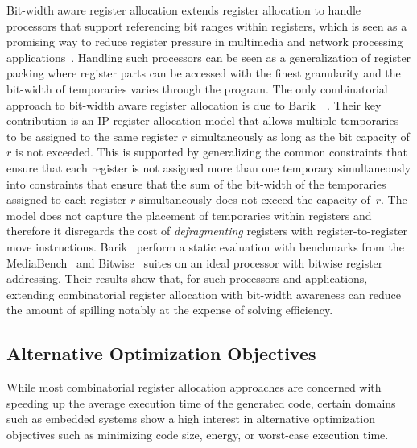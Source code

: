 \documentclass[acmsmall,authorversion,nonacm]{acmart}
\begin{document}
Bit-width aware register allocation extends register allocation to
handle processors that support referencing bit ranges within
registers, which is seen as a promising way to reduce register
pressure in multimedia and network processing
applications~\cite{Tallam2003,Nandivada2013}.
Handling such processors can be seen as a generalization of register
packing where register parts can be accessed with the finest
granularity and the bit-width of temporaries varies through the
program.
The only combinatorial approach to bit-width aware register allocation
is due to Barik~\etal{}~\cite{Barik2007}.
Their key contribution is an IP register allocation model that allows
multiple temporaries to be assigned to the same register $r$
simultaneously as long as the bit capacity of $r$ is not exceeded.
This is supported by generalizing the common constraints that ensure
that each register is not assigned more than one temporary
simultaneously into constraints that ensure that the sum of the
bit-width of the temporaries assigned to each register $r$
simultaneously does not exceed the capacity of~$r$.
The model does not capture the placement of temporaries within
registers and therefore it disregards the cost of \emph{defragmenting}
registers with register-to-register move instructions.
Barik~\etal{} perform a static evaluation with benchmarks from the
MediaBench~\cite{Lee1997} and Bitwise~\cite{Stephenson2000} suites on
an ideal processor with bitwise register addressing.
Their results show that, for such processors and applications,
extending combinatorial register allocation with bit-width awareness
can reduce the amount of spilling notably at the expense of
solving efficiency.

\subsection{Alternative Optimization Objectives}
\label{sec:alternative-optimization-objectives}

While most combinatorial register allocation approaches are concerned
with speeding up the average execution time of the generated code,
certain domains such as embedded systems show a high interest in
alternative optimization objectives such as minimizing code size,
energy, or worst-case execution time.
\end{document}
